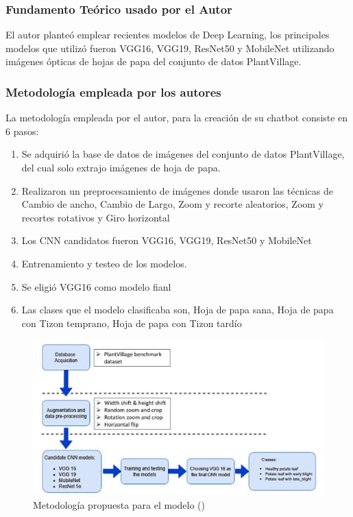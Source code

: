 \subsubsection{Fundamento Teórico usado por el Autor}
El autor planteó emplear recientes modelos de Deep Learning, los principales modelos que utilizó fueron VGG16, VGG19, ResNet50 y MobileNet utilizando imágenes ópticas de hojas de papa del conjunto de datos PlantVillage.


\subsubsection{Metodología empleada por los autores}
La metodología empleada por el autor, para la creación de su chatbot consiste en 6 pasos: 

\begin{enumerate}
\item Se adquirió la base de datos de imágenes del conjunto de datos PlantVillage, del cual solo extrajo imágenes de hoja de papa.
\item Realizaron un preprocesamiento de imágenes donde usaron las técnicas de Cambio de ancho, Cambio de Largo, Zoom y recorte aleatorios, Zoom y recortes rotativos y Giro horizontal
\item Los CNN candidatos fueron  VGG16, VGG19, ResNet50 y MobileNet
\item Entrenamiento y testeo de los modelos.
\item Se eligió VGG16 como modelo fianl
\item Las clases que el modelo clasificaba son, Hoja de papa sana, Hoja de papa con Tizon temprano, Hoja de papa con Tizon tardío
\end{enumerate}
\begin{figure}[h]
	\begin{center}
		\includegraphics[width=1\textwidth]{2/figures/ant1.jpeg}
		\caption{Metodología propuesta para el modelo 
		(\cite{CHAKRABORTY2022101781})}
	\end{center}
\end{figure}

